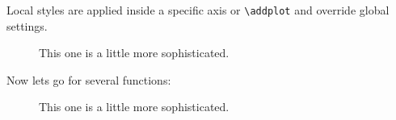 


Local styles are applied inside a specific axis or \verb*|\addplot| and override global settings.

%

\begin{figure}[h]
	\centering
	
	\caption{This one is a little more sophisticated.}
	\label{fig:simplepgfexample2}
\end{figure}

Now lets go for several functions:

%

\begin{figure*}[h]
	\centering
	
	\caption{This one is a little more sophisticated.}
	\label{fig:simplepgfexample3}
\end{figure*}

